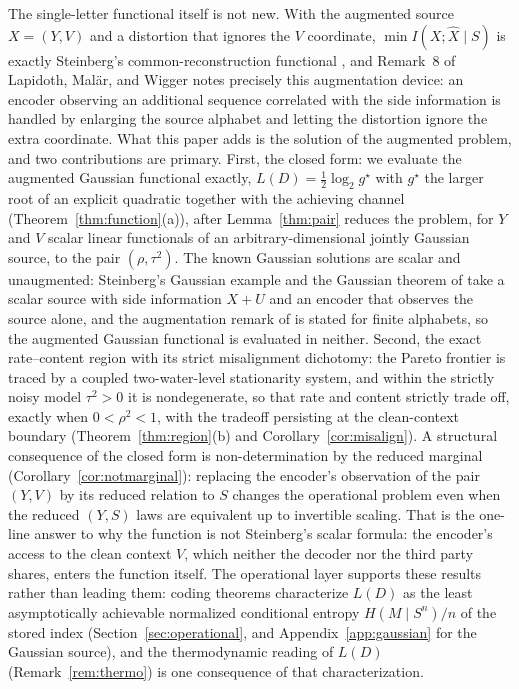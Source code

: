 \documentclass[11pt,onecolumn]{IEEEtran}
\newcommand{\hX}{\widehat{X}}
\begin{document}
The single-letter functional itself is not new. With the augmented source
$X=(Y,V)$ and a distortion that ignores the $V$ coordinate,
$\min I(X;\hX\mid S)$ is exactly Steinberg's common-reconstruction
functional \cite{steinberg2009}, and Remark~8 of Lapidoth, Mal\"ar, and
Wigger \cite{lapidoth2014} notes precisely this augmentation device: an
encoder observing an additional sequence correlated with the side
information is handled by enlarging the source alphabet and letting the
distortion ignore the extra coordinate. What this paper adds is the
solution of the augmented problem, and two contributions are primary.
First, the closed form: we evaluate the augmented Gaussian functional
exactly, $L(D)=\tfrac12\log_2 g^\star$ with $g^\star$ the larger root of
an explicit quadratic together with the achieving channel
(Theorem~\ref{thm:function}(a)), after Lemma~\ref{thm:pair} reduces the
problem, for $Y$ and $V$ scalar linear functionals of an
arbitrary-dimensional jointly Gaussian source, to the pair
$(\rho,\tau^2)$. The known Gaussian solutions are scalar and
unaugmented: Steinberg's Gaussian example \cite{steinberg2009} and the
Gaussian theorem of \cite{lapidoth2014} take a scalar source with side
information $X+U$ and an encoder that observes the source alone, and
the augmentation remark of \cite{lapidoth2014} is stated for finite
alphabets, so the augmented Gaussian functional is evaluated in
neither. Second, the
exact rate--content region with its strict misalignment dichotomy: the
Pareto frontier is traced by a coupled two-water-level stationarity
system, and within the strictly noisy model $\tau^2>0$ it is
nondegenerate, so that rate and content strictly trade off, exactly when
$0<\rho^2<1$, with the tradeoff persisting at the clean-context boundary
(Theorem~\ref{thm:region}(b) and Corollary~\ref{cor:misalign}). A
structural consequence of the closed form is non-determination by the
reduced marginal (Corollary~\ref{cor:notmarginal}): replacing the encoder's observation of
the pair $(Y,V)$ by its reduced relation to $S$ changes the operational
problem even when the reduced $(Y,S)$ laws are equivalent up to invertible
scaling. That is the one-line answer to why the function is not
Steinberg's scalar formula: the encoder's access to the clean context
$V$, which neither the decoder nor the third party shares, enters the
function itself. The operational layer supports these results rather than
leading them: coding theorems characterize $L(D)$ as the least
asymptotically achievable normalized conditional entropy $H(M\mid S^n)/n$
of the stored index (Section~\ref{sec:operational}, and
Appendix~\ref{app:gaussian} for the Gaussian source), and the
thermodynamic reading of $L(D)$ (Remark~\ref{rem:thermo}) is one
consequence of that characterization.
\end{document}
